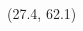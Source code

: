 \documentclass[final]{beamer}
\begin{document}
\begin{frame}{}
\begin{textblock}{25.2}
      

      \end{textblock}
  
      \begin{textblock}{25.2}(27.4, 62.1)
        \small
          

\end{textblock}
\end{frame}
\end{document}
